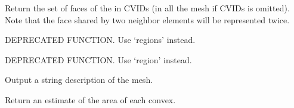 \documentclass[a4paper,11pt,english]{sphinxmanual}
\begin{document}
\begin{fulllineitems}
\begin{fulllineitems}
\end{fulllineitems}


\begin{fulllineitems}
\label{\detokenize{python/cmdref_Mesh:getfem.Mesh.all_faces}}
Return the set of faces of the in CVIDs (in all the mesh if CVIDs is
omitted). Note that the face shared by two neighbor elements will be
represented twice.

\end{fulllineitems}


\begin{fulllineitems}
\label{\detokenize{python/cmdref_Mesh:getfem.Mesh.boundaries}}
DEPRECATED FUNCTION. Use ‘regions’ instead.

\end{fulllineitems}


\begin{fulllineitems}
\label{\detokenize{python/cmdref_Mesh:getfem.Mesh.boundary}}
DEPRECATED FUNCTION. Use ‘region’ instead.

\end{fulllineitems}


\begin{fulllineitems}
\label{\detokenize{python/cmdref_Mesh:getfem.Mesh.char}}
Output a string description of the mesh.

\end{fulllineitems}


\begin{fulllineitems}
\label{\detokenize{python/cmdref_Mesh:getfem.Mesh.convex_area}}
Return an estimate of the area of each convex.


\end{fulllineitems}
\end{fulllineitems}
\end{document}
